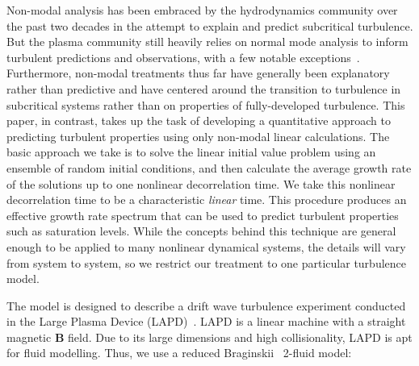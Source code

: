 \documentclass[showpacs,preprintnumbers,amsmath,amssymb,superscriptaddress,aip]{revtex4-1}
\begin{document}
Non-modal analysis has been embraced by the hydrodynamics community over the past two decades in the attempt to explain and predict subcritical turbulence. But the plasma community
still heavily relies on normal mode analysis to inform turbulent predictions and observations, with a few notable exceptions~\cite{camargo1998,camporeale2010,schekochihin2012}. 
Furthermore, non-modal treatments thus far have generally been explanatory rather than predictive and have centered around the transition to turbulence in subcritical systems rather 
than on properties of fully-developed turbulence.
This paper, in contrast, takes up the task of developing a quantitative approach to predicting turbulent properties using only non-modal linear calculations. 
The basic approach we take is to solve the linear initial value problem using an ensemble of random initial conditions, 
and then calculate the average growth rate of the solutions up to one nonlinear decorrelation time. We take this nonlinear decorrelation time to be a characteristic \emph{linear} time.
This procedure produces an effective growth rate spectrum that can be used to predict turbulent properties such as saturation levels.
While the concepts behind this technique are general enough to be applied to many nonlinear dynamical systems, the details will vary from system to system, 
so we restrict our treatment to one particular turbulence model.

The model is designed to describe a drift wave turbulence experiment conducted in the Large Plasma Device (LAPD)~\cite{gekelman1991}. LAPD is a linear machine with a straight magnetic $\mathbf{B}$ field.
Due to its large dimensions and high collisionality, LAPD is apt for fluid modelling. Thus, we use a reduced Braginskii~\cite{Braginskii1965} 2-fluid model:
\end{document}
